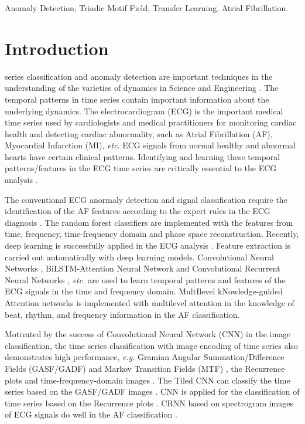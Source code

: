 \documentclass[journal]{IEEEtran}
\begin{document}
\begin{IEEEkeywords}
Anomaly Detection, Triadic Motif Field, Transfer Learning, Atrial Fibrillation.
\end{IEEEkeywords}

\section{Introduction}
\label{sec:introduction}
 series classification and anomaly detection are important techniques in the understanding of the varieties of dynamics in Science and Engineering \cite{TSC_review_2009,anomaly_2009}. The temporal patterns in time series contain important information about the underlying dynamics. The electrocardiogram (ECG) is the important medical time series used by cardiologists and medical practitioners for monitoring cardiac health and detecting cardiac abnormality, such as Atrial Fibrillation (AF), Myocardial Infarction (MI), {\it etc}. 
ECG signals from normal healthy and abnormal hearts have certain clinical patterns. Identifying and learning these temporal patterns/features in the ECG time series are critically essential to the ECG analysis \cite{ECG_review_2017}.  

The conventional ECG anormaly detection and signal classification require the identification of the AF features according to the expert rules in the ECG diagnosis \cite{RR_traditional_2001,AF_detection_2017}. The random forest classifiers \cite{AF_detection_2017} are implemented with the features from time, frequency, time-frequency domain and phase space reconstruction. 
Recently, deep learning is successfully applied in the ECG analysis \cite{1D_CNN_2016,LSTM_ECG_2019,CRNN_ECG_2017,mina_2019}. Feature extraction is carried out automatically with deep learning models. 
Convolutional Neural Networks \cite{1D_CNN_2016}, BiLSTM-Attention Neural Network \cite{LSTM_ECG_2019} and Convolutional Recurrent Neural Networks \cite{CRNN_ECG_2017}, {\it etc.} are used to learn temporal patterns and features of the ECG signals in the time and frequency domain. MultIlevel kNowledge-guided Attention networks \cite{mina_2019} is implemented with multilevel attention in the knowledge of beat, rhythm, and frequency information in the AF classification. 

Motivated by the success of Convolutional Neural Network (CNN) in the image classification, the time series classification with image encoding of time series also demonstrates high performance, {\it{e.g.}} Gramian Angular Summation/Difference Fields (GASF/GADF) and Markov Transition Fields (MTF) \cite{GAF_MTF_2015}, the Recurrence plots \cite{Recurrence_plot} and time-frequency-domain images \cite{CRNN_ECG_2017}. The Tiled CNN can classify the time series based on the GASF/GADF images \cite{GAF_MTF_2015}. CNN is applied for the classification of time series based on the Recurrence plots \cite{Recurrence_plot}. CRNN based on spectrogram images of ECG signals do well in the AF classification \cite{CRNN_ECG_2017}.
\end{document}
